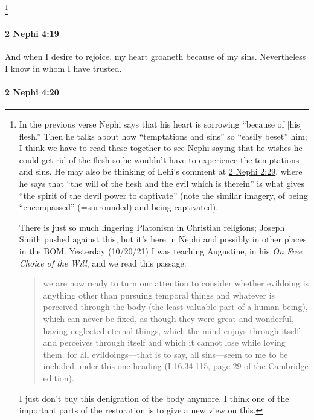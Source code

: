 				\footnote{%
					\label{2NEPHI-4-18-beset}%
					In the previous verse Nephi says that his heart is sorrowing ``because of [his] flesh.'' Then he talks about how ``temptations and sins'' so ``easily beset'' him; I think we have to read these together to see Nephi saying that he wishes he could get rid of the flesh so he wouldn't have to experience the temptations and sins. He may also be thinking of Lehi's comment at \hyperref[2NEPHI-2-29]{2 Nephi 2:29}, where he says that ``the will of the flesh and the evil which is therein'' is what gives ``the spirit of the devil power to captivate'' (note the similar imagery, of being ``encompassed'' (=surrounded) and being captivated).
					
					There is just so much lingering Platonism in Christian religions; Joseph Smith pushed against this, but it's here in Nephi and possibly in other places in the BOM. Yesterday (10/20/21) I was teaching Augustine, in his \textit{On Free Choice of the Will}, and we read this passage:
						\begin{quote}
							we are now ready to turn our attention to consider whether evildoing is anything other than pursuing temporal things and whatever is perceived through the body (the least valuable part of a human being), which can never be fixed, as though they were great and wonderful, having neglected eternal things, which the mind enjoys through itself and perceives through itself and which it cannot lose while loving them. for all evildoings---that is to say, all sins---seem to me to be included under this one heading (I 16.34.115, page 29 of the Cambridge edition).
						\end{quote}
					I just don't buy this denigration of the body anymore. I think one of the important parts of the restoration is to give a new view on this.
					}

		\paragraph{2 Nephi 4:19} %
			\label{2NEPHI-4-19}

			And when I desire to rejoice,
			my heart groaneth because of my sins.
			Nevertheless I know in whom I have trusted.

		\paragraph{2 Nephi 4:20} %
			\label{2NEPHI-4-20}

